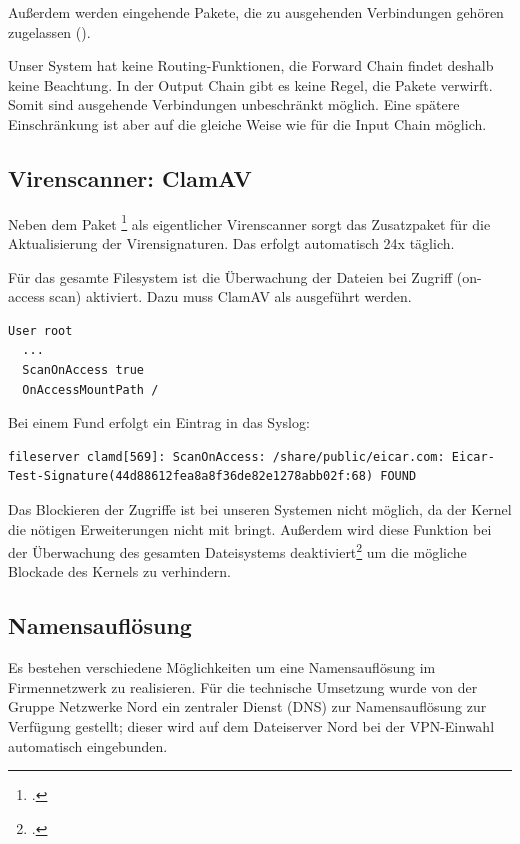 Außerdem werden eingehende Pakete, die zu ausgehenden Verbindungen gehören zugelassen ().

Unser System hat keine Routing-Funktionen, die Forward Chain findet deshalb keine Beachtung. In der Output Chain gibt es keine Regel, die Pakete verwirft. Somit sind ausgehende Verbindungen unbeschränkt möglich. Eine spätere Einschränkung ist aber auf die gleiche Weise wie für die Input Chain möglich.

\subsection{Virenscanner: ClamAV}
Neben dem Paket \footcite{clamav} als eigentlicher Virenscanner sorgt das Zusatzpaket  für die Aktualisierung der Virensignaturen. Das erfolgt automatisch 24x täglich.

Für das gesamte Filesystem ist die Überwachung der Dateien bei Zugriff (on-access scan) aktiviert. Dazu muss ClamAV als  ausgeführt werden.  

\begin{lstlisting}[label=code:denyany,caption=Konfiguration in clamav.conf]
  User root
  ...
  ScanOnAccess true
  OnAccessMountPath /
\end{lstlisting}

Bei einem Fund erfolgt ein Eintrag in das Syslog:
\begin{lstlisting}[label=code:denyany,caption=Syslog Eintrag bei Virenfund]
  fileserver clamd[569]: ScanOnAccess: /share/public/eicar.com: Eicar-Test-Signature(44d88612fea8a8f36de82e1278abb02f:68) FOUND
\end{lstlisting}

Das Blockieren der Zugriffe ist bei unseren Systemen nicht möglich, da der Kernel die nötigen Erweiterungen nicht mit bringt. Außerdem wird diese Funktion bei der Überwachung des gesamten Dateisystems deaktiviert\footcite{clamAVnoOnAccess} um die mögliche Blockade des Kernels zu verhindern.

\subsection{Namensauflösung}
Es bestehen verschiedene Möglichkeiten um eine Namensauflösung im Firmennetzwerk zu realisieren. Für die technische Umsetzung wurde von der Gruppe Netzwerke Nord ein zentraler Dienst (DNS) zur Namensauflösung zur Verfügung gestellt; dieser wird auf dem Dateiserver Nord bei der VPN-Einwahl automatisch eingebunden. 

